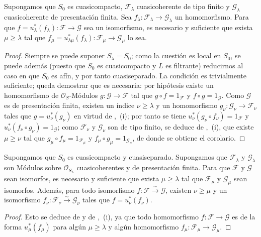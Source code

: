 \begin{corollary}[8.5.2.4]
\label{IV.8.5.2.4-fr}
Supongamos que $S_0$ es cuasicompacto, $\mathcal F_\lambda$ cuasicoherente de tipo finito y $\mathcal G_\lambda$ cuasicoherente de presentación finita.
Sea $f_\lambda:\mathcal F_\lambda\to\mathcal G_\lambda$ un homomorfismo.
Para que $f=u_\lambda^*(f_\lambda):\mathcal F\to\mathcal G$ sea un isomorfismo, es necesario y suficiente que exista $\mu\geq\lambda$ tal que $f_\mu=u_{\lambda\mu}^*(f_\lambda):\mathcal F_\mu\to\mathcal G_\mu$ lo sea.
\end{corollary}

\begin{proof}
Siempre se puede suponer $S_\lambda=S_0$; como la cuestión es local en $S_0$, se puede además (puesto que $S_0$ es cuasicompacto y $L$ es filtrante) reducirnos al caso en que $S_0$ es afín, y por tanto cuasiseparado.
La condición es trivialmente suficiente; queda demostrar que es necesaria: por hipótesis existe un homomorfismo de $\mathcal O_S$-Módulos $g:\mathcal G\to\mathcal F$ tal que $g\circ f=1_{\mathcal F}$ y $f\circ g=1_{\mathcal G}$.
Como $\mathcal G$ es de presentación finita, existen un índice $\nu\geq\lambda$ y un homomorfismo $g_\nu:\mathcal G_\nu\to\mathcal F_\nu$ tales que $g=u_\nu^*(g_\nu)$ en virtud de ,~(i); por tanto se tiene
$u_\nu^*(g_\nu\circ f_\nu)=1_{\mathcal F}$
y $u_\nu^*(f_\nu\circ g_\nu)=1_{\mathcal G}$; como $\mathcal F_\nu$ y $\mathcal G_\nu$ son de tipo finito, se deduce de ,~(i), que existe $\mu\geq\nu$ tal que $g_\mu\circ f_\mu=1_{\mathcal F_\mu}$ y $f_\mu\circ g_\mu=1_{\mathcal G_\mu}$, de donde se obtiene el corolario.
\end{proof}

\begin{corollary}[8.5.2.5]
\label{IV.8.5.2.5-fr}
Supongamos que $S_0$ es cuasicompacto y cuasiseparado.
Supongamos que $\mathcal F_\lambda$ y $\mathcal G_\lambda$ son Módulos sobre $\mathcal O_{S_\lambda}$ cuasicoherentes y de presentación finita.
Para que $\mathcal F$ y $\mathcal G$ sean isomorfos, es necesario y suficiente que exista $\mu\geq\lambda$ tal que $\mathcal F_\mu$ y $\mathcal G_\mu$ sean isomorfos.
Además, para todo isomorfismo $f:\mathcal F\xrightarrow{\sim}\mathcal G$, existen $\nu\geq\mu$ y un isomorfismo $f_\nu:\mathcal F_\nu\xrightarrow{\sim}\mathcal G_\nu$ tales que $f=u_\nu^*(f_\nu)$.
\end{corollary}

\begin{proof}
Esto se deduce de  y de ,~(i), ya que todo homomorfismo $f:\mathcal F\to\mathcal G$ es de la forma $u_\mu^*(f_\mu)$ para algún $\mu\geq\lambda$ y algún homomorfismo $f_\mu:\mathcal F_\mu\to\mathcal G_\mu$.
\end{proof}

